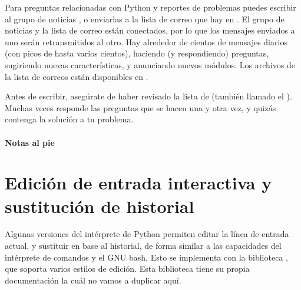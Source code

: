 \documentclass[a4,10pt,spanish]{sphinxmanual}
\begin{document}
\sphinxAtStartPar
Para preguntas relacionadas con Python y reportes de problemas puedes escribir al grupo de noticias , o enviarlas a la lista de correo que hay en . El grupo de noticias y la lista de correo están conectados, por lo que los mensajes enviados a uno serán retransmitidos al otro.  Hay alrededor de cientos de mensajes diarios (con picos de hasta varios cientos), haciendo (y respondiendo) preguntas, sugiriendo nuevas características, y anunciando nuevos módulos. Los archivos de la lista de correos están disponibles en .

\sphinxAtStartPar
Antes de escribir, asegúrate de haber revisado la lista de  (también llamado el ). Muchas veces responde las preguntas que se hacen una y otra vez, y quizás contenga la solución a tu problema.
\subsubsection*{Notas al pie}

\chapter{Edición de entrada interactiva y sustitución de historial}


\label{\detokenize{tutorial/interactive:interactive-input-editing-and-history-substitution}}\label{\detokenize{tutorial/interactive:tut-interacting}}\label{\detokenize{tutorial/interactive::doc}}
\sphinxAtStartPar
Algunas versiones del intérprete de Python permiten editar la línea de entrada actual, y sustituir en base al historial, de forma similar a las capacidades del intérprete de comandos  y el GNU bash.  Esto se implementa con la biblioteca , que soporta varios estilos de edición.  Esta biblioteca tiene su propia documentación la cuál no vamos a duplicar aquí.
\end{document}
